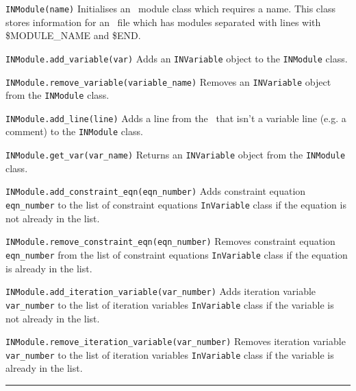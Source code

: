 \begin{description}

\item{\verb|INModule(name)|} Initialises an \indat\ module class which
  requires a name. This class stores information for an \indat\ file which has
  modules separated with lines with \$MODULE\_NAME and \$END.

\item{\verb|INModule.add_variable(var)|} Adds an \verb|INVariable| object to
  the \verb|INModule| class.

\item{\verb|INModule.remove_variable(variable_name)|} Removes an
  \verb|INVariable| object from the \verb|INModule| class.

\item{\verb|INModule.add_line(line)|} Adds a line from the \indat\ that isn't
  a variable line (e.g. a comment) to the \verb|INModule| class.

\item{\verb|INModule.get_var(var_name)|} Returns an \verb|INVariable| object
  from the \verb|INModule| class.

\item{\verb|INModule.add_constraint_eqn(eqn_number)|} Adds constraint
  equation \verb|eqn_number| to the list of constraint equations
  \verb|InVariable| class if the equation is not already in the list.

\item{\verb|INModule.remove_constraint_eqn(eqn_number)|} Removes
  constraint equation \verb|eqn_number| from the list of constraint
  equations \verb|InVariable| class if the equation is already in the list.

\item{\verb|INModule.add_iteration_variable(var_number)|} Adds iteration
  variable \verb|var_number| to the list of iteration variables
  \verb|InVariable| class if the variable is not already in the list.

\item{\verb|INModule.remove_iteration_variable(var_number)|} Removes
  iteration variable \verb|var_number| to the list of iteration variables
  \verb|InVariable| class if the variable is already in the list.

\end{description}

\rule{\textwidth}{0.4pt}

